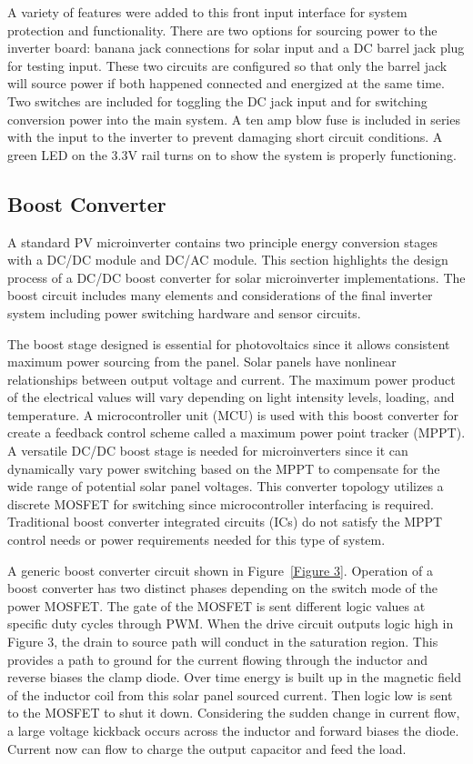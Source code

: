 A variety of features were added to this front input interface for system protection and functionality. There are two options for sourcing power to the inverter board: banana jack connections for solar input and a DC barrel jack plug for testing input. These two circuits are configured so that only the barrel jack will source power if both happened connected and energized at the same time. Two switches are included for toggling the DC jack input and for switching conversion power into the main system. A ten amp blow fuse is included in series with the input to the inverter to prevent damaging short circuit conditions. A green LED on the 3.3V rail turns on to show the system is properly functioning.

\subsection{Boost Converter}
A standard PV microinverter contains two principle energy conversion stages with a DC/DC module and DC/AC module. This section highlights the design process of a DC/DC boost converter for solar microinverter implementations. The boost circuit includes many elements and considerations of the final inverter system including power switching hardware and sensor circuits.

The boost stage designed is essential for photovoltaics since it allows consistent maximum power sourcing from the panel. Solar panels have nonlinear relationships between output voltage and current. The maximum power product of the electrical values will vary depending on light intensity levels, loading, and temperature. A microcontroller unit (MCU) is used with this boost converter for create a feedback control scheme called a maximum power point tracker (MPPT). A versatile DC/DC boost stage is needed for microinverters since it can dynamically vary power switching based on the MPPT to compensate for the wide range of potential solar panel voltages. This converter topology utilizes a discrete MOSFET for switching since microcontroller interfacing is required. Traditional boost converter integrated circuits (ICs) do not satisfy the MPPT control needs or power requirements needed for this type of system.  


A generic boost converter circuit shown in Figure~\ref{Figure 3}. Operation of a boost converter has two distinct phases depending on the switch mode of the power MOSFET. The gate of the MOSFET is sent different logic values at specific duty cycles through PWM. When the drive circuit outputs logic high in Figure 3, the drain to source path will conduct in the saturation region. This provides a path to ground for the current flowing through the inductor and reverse biases the clamp diode. Over time energy is built up in the magnetic field of the inductor coil from this solar panel sourced current. Then logic low is sent to the MOSFET to shut it down. Considering the sudden change in current flow, a large voltage kickback occurs across the inductor and forward biases the diode. Current now can flow to charge the output capacitor and feed the load.

